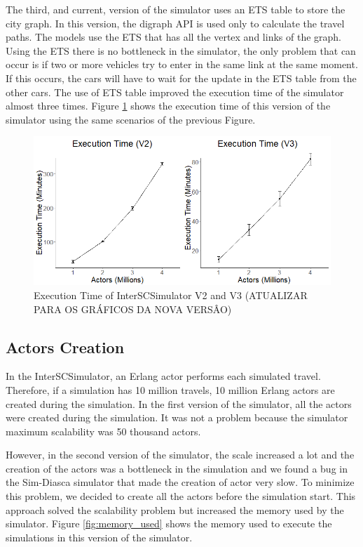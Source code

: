 The third, and current, version of the simulator uses an ETS table to store the city graph. In this version, the digraph API is used only to calculate the travel paths. The models use the ETS that has all the vertex and links of the graph. Using the ETS there is no bottleneck in the simulator, the only problem that can occur is if two or more vehicles try to enter in the same link at the same moment. If this occurs, the cars will have to wait for the update in the ETS table from the other cars. The use of ETS table improved the execution time of the simulator almost three times. Figure \ref{fig:execution_time} shows the execution time of this version of the simulator using the same scenarios of the previous Figure.

\begin{figure}[!htb]
\centering
\includegraphics[width=1.0\textwidth]{figuras/chap-interscsimulator/execution_time.png}
\caption{Execution Time of InterSCSimulator V2 and V3 (ATUALIZAR PARA OS GRÁFICOS DA NOVA VERSÂO)}
\label{fig:execution_time}
\end{figure}

\subsection{Actors Creation}

In the InterSCSimulator, an Erlang actor performs each simulated travel. Therefore, if a simulation has 10 million travels, 10 million Erlang actors are created during the simulation. In the first version of the simulator, all the actors were created during the simulation. It was not a problem because the simulator maximum scalability was 50 thousand actors.

However, in the second version of the simulator, the scale increased a lot and the creation of the actors was a bottleneck in the simulation and we found a bug in the Sim-Diasca simulator that made the creation of actor very slow. To minimize this problem, we decided to create all the actors before the simulation start. This approach solved the scalability problem but increased the memory used by the simulator. Figure \ref{fig:memory_used} shows the memory used to execute the simulations in this version of the simulator.

